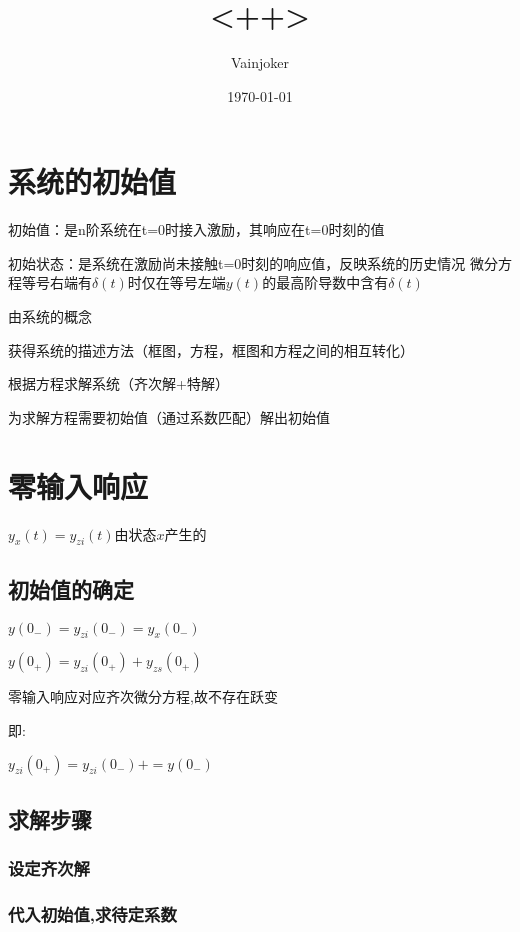 \documentclass{article}
\title{<++>}
\author{Vainjoker}
\date{\today}
\begin{document}
    \maketitle
    \newpage
    
    \section{系统的初始值}%

        初始值：是n阶系统在t=0时接入激励，其响应在t=0时刻的值

        初始状态：是系统在激励尚未接触t=0时刻的响应值，反映系统的历史情况
        微分方程等号右端有$\delta(t)$时仅在等号左端$y(t)$的最高阶导数中含有$\delta(t)$

        
        由系统的概念

        获得系统的描述方法（框图，方程，框图和方程之间的相互转化）

        根据方程求解系统（齐次解+特解）

        为求解方程需要初始值（通过系数匹配）解出初始值

    \section{零输入响应}%
    $y_{x}(t)=y_{zi}(t)$由状态$x$产生的
    
    \subsection{初始值的确定}%

    $y(0_-)=y_{zi}(0_-)=y_{x}(0_-)$

    $y(0_+)=y_{zi}(0_+)+y_{zs}(0_+)$

    零输入响应对应齐次微分方程,故不存在跃变

    即: 

    $y_{zi}(0_+)=y_{zi}(0_-)+=y(0_-)$
    
    \subsection{求解步骤}%
        \subsubsection{设定齐次解}%
        \subsubsection{代入初始值,求待定系数}%
    
\end{document}
